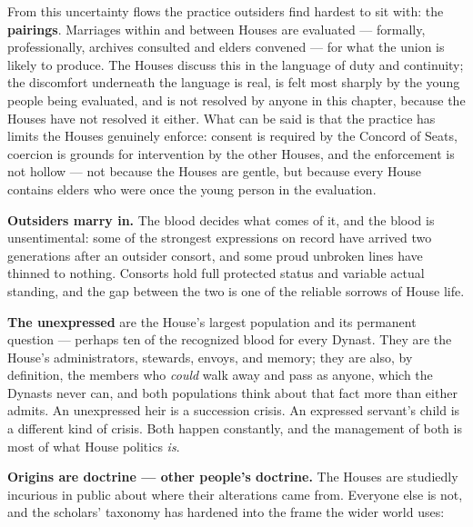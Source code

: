 From this uncertainty flows the practice outsiders find hardest to sit with: the \textbf{pairings}. Marriages within and between Houses are evaluated --- formally, professionally, archives consulted and elders convened --- for what the union is likely to produce. The Houses discuss this in the language of duty and continuity; the discomfort underneath the language is real, is felt most sharply by the young people being evaluated, and is not resolved by anyone in this chapter, because the Houses have not resolved it either. What can be said is that the practice has limits the Houses genuinely enforce: consent is required by the Concord of Seats, coercion is grounds for intervention by the other Houses, and the enforcement is not hollow --- not because the Houses are gentle, but because every House contains elders who were once the young person in the evaluation.

\textbf{Outsiders marry in.} The blood decides what comes of it, and the blood is unsentimental: some of the strongest expressions on record have arrived two generations after an outsider consort, and some proud unbroken lines have thinned to nothing. Consorts hold full protected status and variable actual standing, and the gap between the two is one of the reliable sorrows of House life.

\textbf{The unexpressed} are the House's largest population and its permanent question --- perhaps ten of the recognized blood for every Dynast. They are the House's administrators, stewards, envoys, and memory; they are also, by definition, the members who \textit{could} walk away and pass as anyone, which the Dynasts never can, and both populations think about that fact more than either admits. An unexpressed heir is a succession crisis. An expressed servant's child is a different kind of crisis. Both happen constantly, and the management of both is most of what House politics \textit{is}.

\textbf{Origins are doctrine --- other people's doctrine.} The Houses are studiedly incurious in public about where their alterations came from. Everyone else is not, and the scholars' taxonomy has hardened into the frame the wider world uses:

